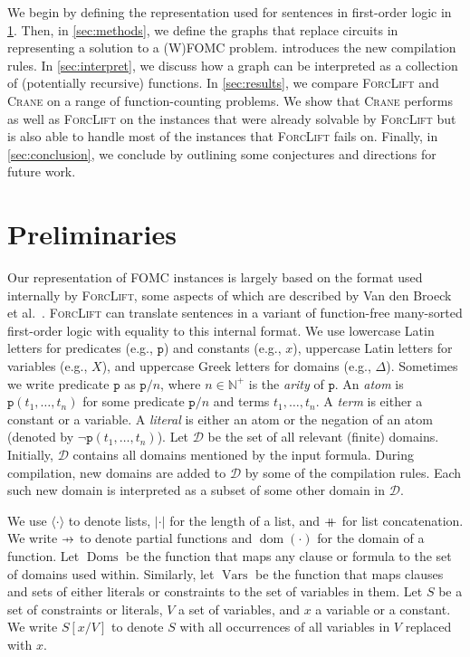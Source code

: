 \documentclass{article}
\theoremstyle{definition}
\theoremstyle{remark}
\newcommand\pfun{\mathrel{\ooalign{\hfil$\mapstochar\mkern5mu$\hfil\cr$\to$\cr}}}
\newcommand\mdoubleplus{\mathbin{+\mkern-10mu+}}
\DeclareMathOperator{\dom}{dom}
\DeclareMathOperator{\Doms}{Doms}
\DeclareMathOperator{\Vars}{Vars}
\begin{document}

We begin by defining the representation used for sentences in first-order logic
in \cref{sec:recprelims}. Then, in \cref{sec:methods}, we define the graphs that
replace circuits in representing a solution to a (W)FOMC problem.
 introduces the new compilation rules. In \cref{sec:interpret},
we discuss how a graph can be interpreted as a collection of (potentially
recursive) functions. In \cref{sec:results}, we compare \textsc{ForcLift} and
\textsc{Crane} on a range of function-counting problems. We show that
\textsc{Crane} performs as well as \textsc{ForcLift} on the instances that were
already solvable by \textsc{ForcLift} but is also able to handle most of the
instances that \textsc{ForcLift} fails on. Finally, in \cref{sec:conclusion}, we
conclude by outlining some conjectures and directions for future work.

\section{Preliminaries}\label{sec:recprelims}

Our representation of FOMC instances is largely based on the format used
internally by \textsc{ForcLift}, some aspects of which are described by Van den
Broeck et al.~. \textsc{ForcLift} can
translate sentences in a variant of function-free many-sorted first-order logic
with equality to this internal format. We use lowercase Latin letters for
predicates (e.g., $\texttt{p}$) and constants (e.g., $x$), uppercase Latin
letters for variables (e.g., $X$), and uppercase Greek letters for domains
(e.g., $\Delta$). Sometimes we write predicate $\texttt{p}$ as $\texttt{p}/n$,
where $n \in \mathbb{N}^{+}$ is the \emph{arity} of $\texttt{p}$. An \emph{atom}
is $\texttt{p}(t_1, \dots, t_n)$ for some predicate $\texttt{p}/n$ and terms
$t_{1}, \dots, t_{n}$. A \emph{term} is either a constant or a variable. A
\emph{literal} is either an atom or the negation of an atom (denoted by
$\neg \texttt{p}(t_1, \dots, t_n)$). Let $\mathcal{D}$ be the set of all
relevant (finite) domains. Initially, $\mathcal{D}$ contains all domains
mentioned by the input formula. During compilation, new domains are added to
$\mathcal{D}$ by some of the compilation rules. Each such new domain is
interpreted as a subset of some other domain in $\mathcal{D}$.

We use $\langle\cdot\rangle$ to denote lists, $|\cdot|$ for the length of a
list, and $\mdoubleplus$ for list concatenation. We write $\pfun$ to denote
partial functions and $\dom(\cdot)$ for the domain of a function. Let $\Doms$ be
the function that maps any clause or formula to the set of domains used within.
Similarly, let $\Vars$ be the function that maps clauses and sets of either
literals or constraints to the set of variables in them. Let $S$ be a set of
constraints or literals, $V$ a set of variables, and $x$ a variable or a
constant. We write $S[x/V]$ to denote $S$ with all occurrences of all variables
in $V$ replaced with $x$.
\end{document}
